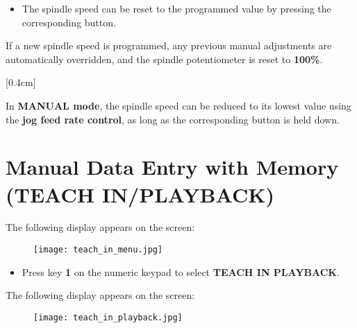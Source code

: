 \begin{itemize}
    \item The spindle speed can be reset to the programmed value by pressing the corresponding button.
\end{itemize}

If a new spindle speed is programmed, any previous manual adjustments are automatically overridden, and the spindle potentiometer is reset to \textbf{100\%}.

[0.4cm]

In \textbf{MANUAL mode}, the spindle speed can be reduced to its lowest value using the \textbf{jog feed rate control}, as long as the corresponding button is held down.

\newpage

\section{Manual Data Entry with Memory (TEACH IN/PLAYBACK)}

\procedure

\begin{itemize}
\end{itemize}

\vspace{.5cm}

\begin{itemize}
\end{itemize}
\vspace{.5cm}
The following display appears on the screen:

\begin{figure}[h]
    \centering
    \texttt{[image: teach\_in\_menu.jpg]}
\end{figure}

\begin{itemize}
    \item Press key \textbf{1} on the numeric keypad to select \textbf{TEACH IN PLAYBACK}.
\end{itemize}

The following display appears on the screen:

\begin{figure}[h]
    \centering
    \texttt{[image: teach\_in\_playback.jpg]}
\end{figure}
\newpage
\begin{itemize}
\end{itemize}

